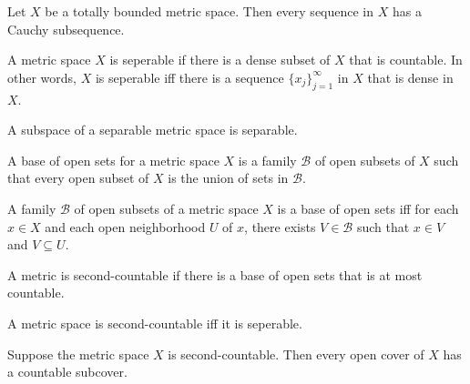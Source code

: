 \documentclass[nobib,notoc]{tufte-handout}
\begin{document}
\begin{thm}
	Let \(X\) be a totally bounded metric space. Then every sequence in \(X\) has a Cauchy subsequence.
\end{thm}
\begin{defi}[Seperability]
	A metric space \(X\) is seperable if there is a dense subset of \(X\) that is countable. In other words, \(X\) is seperable iff there is a sequence \(\{x_j\}_{j=1}^{\infty}\) in \(X\) that is dense in \(X\).
\end{defi}
\begin{thm}
	A subspace of a separable metric space is separable.
\end{thm}
\begin{defi}[Base]
	A base of open sets for a metric space \(X\) is a family \(\mathscr{B}\) of open subsets of \(X\) such that every open subset of \(X\) is the union of sets in \(\mathscr{B}\).
\end{defi}
\begin{lem}
	A family \(\mathscr{B}\) of open subsets of a metric space \(X\) is a base of open sets iff for each \(x\in X\) and each open neighborhood \(U\) of \(x\), there exists \(V\in\mathscr{B}\) such that \(x\in V\) and \(V\subseteq U\).
\end{lem}
\begin{defi}
	A metric is second-countable if there is a base of open sets that is at most countable.
\end{defi}
\begin{thm}
	A metric space is second-countable iff it is seperable.
\end{thm}
\begin{thm}
	Suppose the metric space \(X\) is second-countable. Then every open cover of \(X\) has a countable subcover.
\end{thm}
\end{document}
